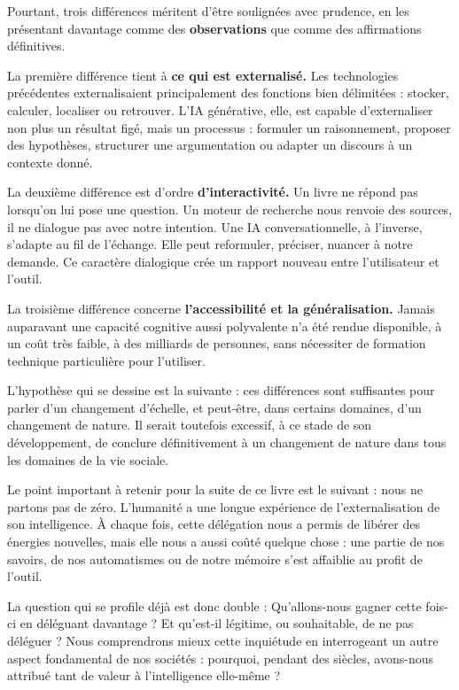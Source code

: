 Pourtant, trois différences méritent d'être soulignées avec prudence, en les présentant davantage comme des \textbf{observations} que comme des affirmations définitives.

La première différence tient à \textbf{ce qui est externalisé.} Les technologies précédentes externalisaient principalement des fonctions bien délimitées : stocker, calculer, localiser ou retrouver. L'IA générative, elle, est capable d'externaliser non plus un résultat figé, mais un processus : formuler un raisonnement, proposer des hypothèses, structurer une argumentation ou adapter un discours à un contexte donné.

La deuxième différence est d'ordre \textbf{d'interactivité.} Un livre ne répond pas lorsqu'on lui pose une question. Un moteur de recherche nous renvoie des sources, il ne dialogue pas avec notre intention. Une IA conversationnelle, à l'inverse, s'adapte au fil de l'échange. Elle peut reformuler, préciser, nuancer à notre demande. Ce caractère dialogique crée un rapport nouveau entre l'utilisateur et l'outil.

La troisième différence concerne \textbf{l'accessibilité et la généralisation.} Jamais auparavant une capacité cognitive aussi polyvalente n'a été rendue disponible, à un coût très faible, à des milliards de personnes, sans nécessiter de formation technique particulière pour l'utiliser.

L'hypothèse qui se dessine est la suivante : ces différences sont suffisantes pour parler d'un changement d'échelle, et peut-être, dans certains domaines, d'un changement de nature. Il serait toutefois excessif, à ce stade de son développement, de conclure définitivement à un changement de nature dans tous les domaines de la vie sociale.

Le point important à retenir pour la suite de ce livre est le suivant : nous ne partons pas de zéro. L'humanité a une longue expérience de l'externalisation de son intelligence. À chaque fois, cette délégation nous a permis de libérer des énergies nouvelles, mais elle nous a aussi coûté quelque chose : une partie de nos savoirs, de nos automatismes ou de notre mémoire s'est affaiblie au profit de l'outil.

La question qui se profile déjà est donc double : Qu'allons-nous gagner cette fois-ci en déléguant davantage ? Et qu'est-il légitime, ou souhaitable, de ne pas déléguer ? Nous comprendrons mieux cette inquiétude en interrogeant un autre aspect fondamental de nos sociétés : pourquoi, pendant des siècles, avons-nous attribué tant de valeur à l'intelligence elle-même ?

